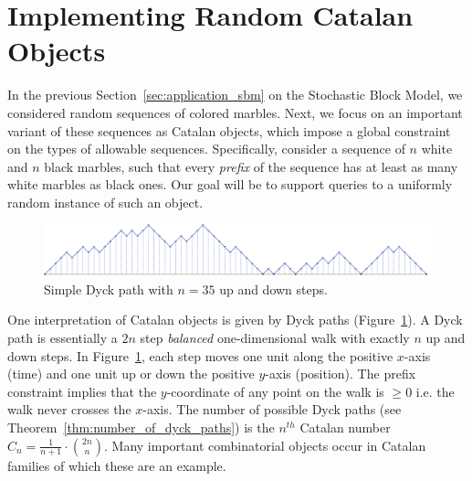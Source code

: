 \section{Implementing Random Catalan Objects}%
\label{sec:catalan_objects}

In the previous Section~\ref{sec:application_sbm} on the Stochastic Block Model, we considered random sequences of colored marbles.
Next, we focus on an important variant of these sequences as Catalan objects, which impose a global constraint on the types of allowable sequences.
Specifically, consider a sequence of $n$ white and $n$ black marbles,
such that every \emph{prefix} of the sequence has at least as many white marbles as black ones.
Our goal will be to support queries to a uniformly random instance of such an object.

\begin{figure}[htbp]
    \centering
    \includegraphics[width=\textwidth]{images/basic_dyck_path.pdf}
    \caption{Simple Dyck path with $n = 35$ up and down steps.}
    \label{fig:basic_dyck}
\end{figure}
One interpretation of Catalan objects is given by Dyck paths (Figure~\ref{fig:basic_dyck}).
A Dyck path is essentially a $2n$ step \emph{balanced} one-dimensional walk with exactly $n$ up and down steps.
In Figure~\ref{fig:basic_dyck}, each step moves one unit along the positive $x$-axis (time) and one unit up or down the positive $y$-axis (position).
The prefix constraint implies that the $y$-coordinate of any point on the walk is $\ge 0$ i.e. the walk never crosses the $x$-axis.
The number of possible Dyck paths (see Theorem~\ref{thm:number_of_dyck_paths}) is the $n^{th}$ Catalan number $C_n=\frac{1}{n+1}\cdot{2n\choose n}$.
Many important combinatorial objects occur in Catalan families of which these are an example.

